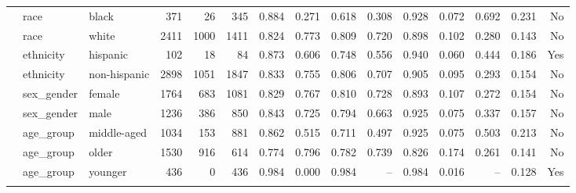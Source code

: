 \begin{longtable}{@{}lllrrrrrrrrrrrr@{}}
 & race & black & 371 & 26 & 345 & 0.884 & 0.271 & 0.618 & 0.308 & 0.928 & 0.072 & 0.692 & 0.231 & No \\
 & race & white & 2411 & 1000 & 1411 & 0.824 & 0.773 & 0.809 & 0.720 & 0.898 & 0.102 & 0.280 & 0.143 & No \\
 & ethnicity & hispanic & 102 & 18 & 84 & 0.873 & 0.606 & 0.748 & 0.556 & 0.940 & 0.060 & 0.444 & 0.186 & Yes \\
 & ethnicity & non-hispanic & 2898 & 1051 & 1847 & 0.833 & 0.755 & 0.806 & 0.707 & 0.905 & 0.095 & 0.293 & 0.154 & No \\
 & sex\_gender & female & 1764 & 683 & 1081 & 0.829 & 0.767 & 0.810 & 0.728 & 0.893 & 0.107 & 0.272 & 0.154 & No \\
 & sex\_gender & male & 1236 & 386 & 850 & 0.843 & 0.725 & 0.794 & 0.663 & 0.925 & 0.075 & 0.337 & 0.157 & No \\
 & age\_group & middle-aged & 1034 & 153 & 881 & 0.862 & 0.515 & 0.711 & 0.497 & 0.925 & 0.075 & 0.503 & 0.213 & No \\
 & age\_group & older & 1530 & 916 & 614 & 0.774 & 0.796 & 0.782 & 0.739 & 0.826 & 0.174 & 0.261 & 0.141 & No \\
 & age\_group & younger & 436 & 0 & 436 & 0.984 & 0.000 & 0.984 & -- & 0.984 & 0.016 & -- & 0.128 & Yes \\
\botrule
\end{longtable}
\endgroup
